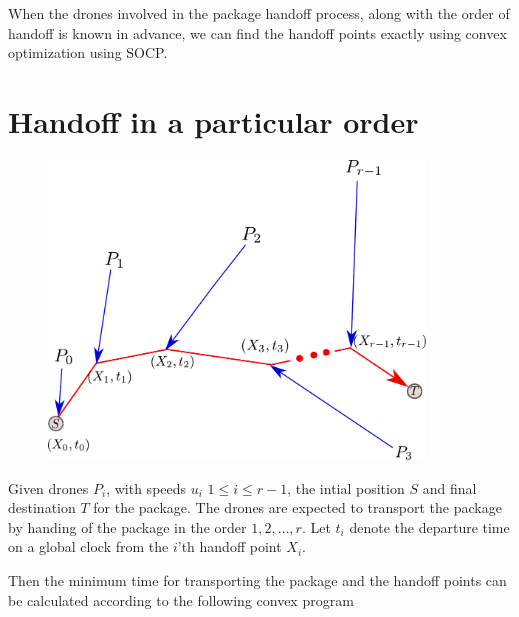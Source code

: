 \documentclass[10.0pt]{report}
\begin{document}
When the drones involved in the package handoff process, along with the order of handoff is known in advance, 
we can find the handoff points exactly using convex optimization using SOCP. 

\section{Handoff in a particular order}

\begin{figure}[H]
\centering
\includegraphics[width=10cm]{images/pho-cvx.pdf}
\end{figure}


Given drones $P_i$, with speeds $u_i$ $1 \leq i \leq r-1$, the intial position $S$ and final destination $T$ for the package. 
The drones are expected to transport the package by handing of the package in the order $1,2,\ldots, r$.
Let $t_i$ denote the departure time on a global clock from the $i$'th handoff point $X_i$. 

Then the minimum time for transporting the package and the handoff points can be calculated according to the following 
convex program 


\noindent{}
\end{document}
